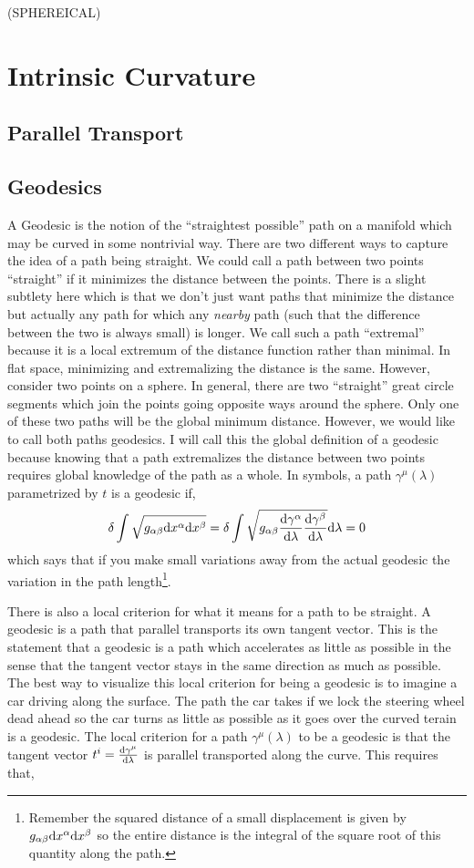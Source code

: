 \documentclass[11pt, a4paper]{article}
\begin{document}
(SPHEREICAL) 

\section{Intrinsic Curvature}

\subsection{Parallel Transport}



\subsection{Geodesics}

A Geodesic is the notion of the ``straightest possible'' path on a manifold which may be curved in some nontrivial way. There are two different ways to capture the idea of a path being straight. We could call a path between two points ``straight'' if it minimizes the distance between the points. There is a slight subtlety here which is that we don't just want paths that minimize the distance but actually any path for which any \textit{nearby} path (such that the difference between the two is always small) is longer. We call such a path ``extremal'' because it is a local extremum of the distance function rather than minimal. 
In flat space, minimizing and extremalizing the distance is the same. However, consider two points on a sphere. In general, there are two ``straight'' great circle segments which join the points going opposite ways around the sphere. Only one of these two paths will be the global minimum distance. However, we would like to call both paths geodesics. I will call this the global definition of a geodesic because knowing that a path extremalizes the distance between two points requires global knowledge of the path as a whole. In symbols,  a path $\gamma^\mu(\lambda)$ parametrized by $t$ is a geodesic if,
\[ \delta \int \sqrt{g_{\alpha \beta} \mathrm{d}x^\alpha \mathrm{d}x^\beta} = \delta \int \sqrt{g_{\alpha \beta} \frac{\mathrm{d}\gamma^\alpha}{\mathrm{d}\lambda} \frac{\mathrm{d}\gamma^\beta}{\mathrm{d}\lambda}} \mathrm{d}\lambda = 0 \]
which says that if you make small variations away from the actual geodesic the variation in the path length\footnote{Remember the squared distance of a small displacement is given by $g_{\alpha \beta} \mathrm{d}x^\alpha \mathrm{d}x^\beta$ so the entire distance is the integral of the square root of this quantity along the path.}.
\par
There is also a local criterion for what it means for a path to be straight. A geodesic is a path that parallel transports its own tangent vector. This is the statement that a geodesic is a path which accelerates as little as possible in the sense that the tangent vector stays in the same direction as much as possible. The best way to visualize this local criterion for being a geodesic is to imagine a car driving along the surface. The path the car takes if we lock the steering wheel dead ahead so the car turns as little as possible as it goes over the curved terain is a geodesic. The local criterion for a path $\gamma^\mu(\lambda)$ to be a geodesic is that the tangent vector $t^i = \frac{\mathrm{d}\gamma^\mu}{\mathrm{d}\lambda}$ is parallel transported along the curve. This requires that,
\end{document}

